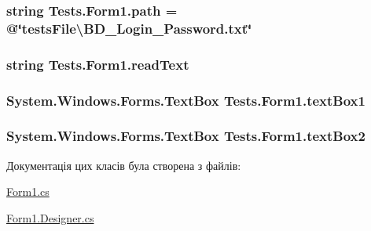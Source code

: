 \subsubsection[{\texorpdfstring{path}{path}}]{\setlength{\rightskip}{0pt plus 5cm}string Tests.\+Form1.\+path = @\char`\"{}tests\+File\textbackslash{}\+B\+D\+\_\+\+Login\+\_\+\+Password.\+txt\char`\"{}\hspace{0.3cm}{\ttfamily [private]}}\hypertarget{class_tests_1_1_form1_a4ed428771494f356b00fc2066168d3f8}{}\label{class_tests_1_1_form1_a4ed428771494f356b00fc2066168d3f8}
\subsubsection[{\texorpdfstring{read\+Text}{readText}}]{\setlength{\rightskip}{0pt plus 5cm}string Tests.\+Form1.\+read\+Text\hspace{0.3cm}{\ttfamily [private]}}\hypertarget{class_tests_1_1_form1_a5184480c920c20fa37adce88de490bd6}{}\label{class_tests_1_1_form1_a5184480c920c20fa37adce88de490bd6}
\subsubsection[{\texorpdfstring{text\+Box1}{textBox1}}]{\setlength{\rightskip}{0pt plus 5cm}System.\+Windows.\+Forms.\+Text\+Box Tests.\+Form1.\+text\+Box1\hspace{0.3cm}{\ttfamily [private]}}\hypertarget{class_tests_1_1_form1_ac36a69acb7a9ed3387b08fd878c5f3ad}{}\label{class_tests_1_1_form1_ac36a69acb7a9ed3387b08fd878c5f3ad}
\subsubsection[{\texorpdfstring{text\+Box2}{textBox2}}]{\setlength{\rightskip}{0pt plus 5cm}System.\+Windows.\+Forms.\+Text\+Box Tests.\+Form1.\+text\+Box2\hspace{0.3cm}{\ttfamily [private]}}\hypertarget{class_tests_1_1_form1_aa2d3b42202675e420de232a5bda1b156}{}\label{class_tests_1_1_form1_aa2d3b42202675e420de232a5bda1b156}


Документація цих класів була створена з файлів\+:\begin{DoxyCompactItemize}
\item 
\hyperlink{_form1_8cs}{Form1.\+cs}\item 
\hyperlink{_form1_8_designer_8cs}{Form1.\+Designer.\+cs}\end{DoxyCompactItemize}

